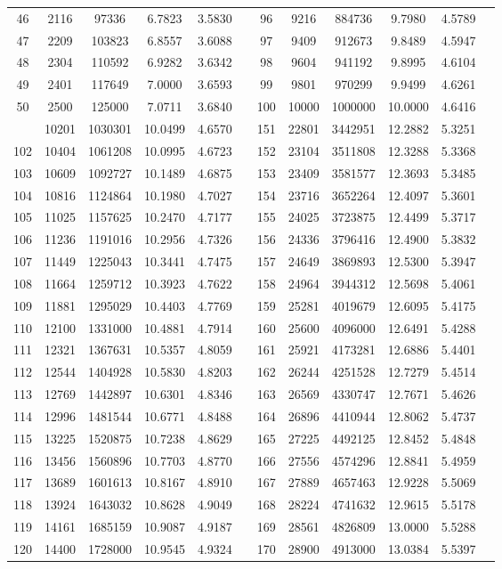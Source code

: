 \begin{longtable}{SSSSSSSSSSSS}
46&2116&97336&6.7823&3.5830&&96&9216&884736&9.7980&4.5789\\
47&2209&103823&6.8557&3.6088&&97&9409&912673&9.8489&4.5947\\
48&2304&110592&6.9282&3.6342&&98&9604&941192&9.8995&4.6104\\
49&2401&117649&7.0000&3.6593&&99&9801&970299&9.9499&4.6261\\
50&2500&125000&7.0711&3.6840&&100&10000&1000000&10.0000&4.6416\\
&10201&1030301&10.0499&4.6570&&151&22801&3442951&12.2882&5.3251\\
102&10404&1061208&10.0995&4.6723&&152&23104&3511808&12.3288&5.3368\\
103&10609&1092727&10.1489&4.6875&&153&23409&3581577&12.3693&5.3485\\
104&10816&1124864&10.1980&4.7027&&154&23716&3652264&12.4097&5.3601\\
105&11025&1157625&10.2470&4.7177&&155&24025&3723875&12.4499&5.3717\\
106&11236&1191016&10.2956&4.7326&&156&24336&3796416&12.4900&5.3832\\
107&11449&1225043&10.3441&4.7475&&157&24649&3869893&12.5300&5.3947\\
108&11664&1259712&10.3923&4.7622&&158&24964&3944312&12.5698&5.4061\\
109&11881&1295029&10.4403&4.7769&&159&25281&4019679&12.6095&5.4175\\
110&12100&1331000&10.4881&4.7914&&160&25600&4096000&12.6491&5.4288\\
111&12321&1367631&10.5357&4.8059&&161&25921&4173281&12.6886&5.4401\\
112&12544&1404928&10.5830&4.8203&&162&26244&4251528&12.7279&5.4514\\
113&12769&1442897&10.6301&4.8346&&163&26569&4330747&12.7671&5.4626\\
114&12996&1481544&10.6771&4.8488&&164&26896&4410944&12.8062&5.4737\\
115&13225&1520875&10.7238&4.8629&&165&27225&4492125&12.8452&5.4848\\
116&13456&1560896&10.7703&4.8770&&166&27556&4574296&12.8841&5.4959\\
117&13689&1601613&10.8167&4.8910&&167&27889&4657463&12.9228&5.5069\\
118&13924&1643032&10.8628&4.9049&&168&28224&4741632&12.9615&5.5178\\
119&14161&1685159&10.9087&4.9187&&169&28561&4826809&13.0000&5.5288\\
120&14400&1728000&10.9545&4.9324&&170&28900&4913000&13.0384&5.5397\\

\end{longtable}
